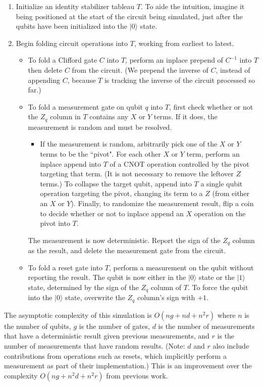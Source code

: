 \documentclass[onecolumn,unpublished]{quantumarticle}
\theoremstyle{definition}
\theoremstyle{definition}
\theoremstyle{definition}
\begin{document}
\begin{enumerate}
    \item Initialize an identity stabilizer tableau $T$.
    To aide the intuition, imagine it being positioned at the start of the circuit being simulated, just after the qubits have been initialized into the $|0\rangle$ state.
    \item Begin folding circuit operations into $T$, working from earliest to latest.
    \begin{itemize}
        \item To fold a Clifford gate $C$ into $T$, perform an inplace prepend of $C^{-1}$ into $T$ then delete $C$ from the circuit.
        (We prepend the inverse of $C$, instead of appending $C$, because $T$ is tracking the inverse of the circuit processed so far.)
        \item To fold a measurement gate on qubit $q$ into $T$, first check whether or not the $Z_q$ column in $T$ contains any $X$ or $Y$ terms.
        If it does, the measurement is random and must be resolved.
        \begin{itemize}
            \item If the measurement is random, arbitrarily pick one of the $X$ or $Y$ terms to be the ``pivot".
            For each other $X$ or $Y$ term, perform an inplace append into $T$ of a CNOT operation controlled by the pivot targeting that term.
            (It is not necessary to remove the leftover $Z$ terms.)
            To collapse the target qubit, append into $T$ a single qubit operation targeting the pivot, changing its term to a $Z$ (from either an $X$ or $Y$).
            Finally, to randomize the measurement result, flip a coin to decide whether or not to inplace append an $X$ operation on the pivot into $T$.
        \end{itemize}
        The measurement is now deterministic.
        Report the sign of the $Z_q$ column as the result, and delete the measurement gate from the circuit.
        \item To fold a reset gate into $T$, perform a measurement on the qubit without reporting the result.
        The qubit is now either in the $|0\rangle$ state or the $|1\rangle$ state, determined by the sign of the $Z_q$ column of $T$.
        To force the qubit into the $|0\rangle$ state, overwrite the $Z_q$ column's sign with $+1$.
    \end{itemize}
\end{enumerate}

The asymptotic complexity of this simulation is $O(ng + nd + n^2r)$ where $n$ is the number of qubits, $g$ is the number of gates, $d$ is the number of measurements that have a deterministic result given previous measurements, and $r$ is the number of measurements that have random results.
(Note: $d$ and $r$ also include contributions from operations such as resets, which implicitly perform a measurement as part of their implementation.)
This is an improvement over the complexity $O(ng + n^2d + n^2r)$ from previous work.
\end{document}
